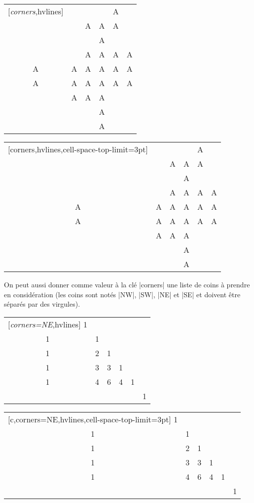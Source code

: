 \documentclass[dvipsnames]{article}%
\begin{document}
\medskip
\begin{Code}[width=11cm]
\begin{NiceTabular}{*{6}{c}}[\emph{corners},hvlines]
  &   &   &   & A \\
  &   & A & A & A \\
  &   &   & A \\
  &   & A & A & A & A \\
A & A & A & A & A & A \\
A & A & A & A & A & A \\
  & A & A & A \\
  &  & & A \\
  &   &   & A \\
\end{NiceTabular}
\end{Code}
\begin{NiceTabular}{*{6}{c}}[corners,hvlines,cell-space-top-limit=3pt]
  &   &   &   & A \\
  &   & A & A & A \\
  &   &   & A \\
  &   & A & A & A & A \\
A & A & A & A & A & A \\
A & A & A & A & A & A \\
  & A & A & A \\
  &  & & A \\
  &   &   & A \\
\end{NiceTabular}

\vspace{1cm}
On peut aussi donner comme valeur à la clé |corners| une liste de coins à
prendre en considération (les coins sont notés |NW|, |SW|, |NE| et |SE| et
doivent être séparés par des virgules).

\medskip
\begin{Code}[width=11cm]
\begin{NiceTabular}{*{6}{c}}[\emph{corners=NE},hvlines]
1\\
1&1\\
1&2&1\\
1&3&3&1\\
1&4&6&4&1\\
 & & & & &1
\end{NiceTabular}
\end{Code}
\begin{NiceTabular}{*{6}{c}}%
  [c,corners=NE,hvlines,cell-space-top-limit=3pt]
1\\
1&1\\
1&2&1\\
1&3&3&1\\
1&4&6&4&1\\
 & & & & &1
\end{NiceTabular}
\end{document}

